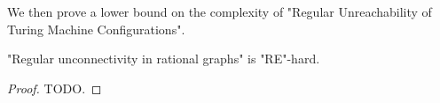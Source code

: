 We then prove a lower bound on the complexity of "Regular Unreachability of Turing Machine Configurations".

\begin{lemma}
	\AP\label{lemma:regular-unconnectivity-lowerbound}
	"Regular unconnectivity in rational graphs" is "RE"-hard.
\end{lemma}

\begin{proof}
	TODO.


\end{proof}

